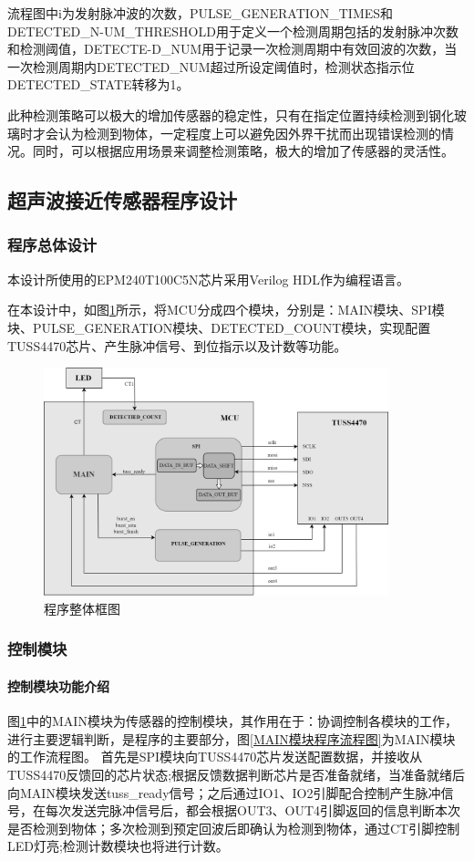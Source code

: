 \newpage
流程图中i为发射脉冲波的次数，PULSE\_GENERATION\_TIMES和DETECTED\_N-UM\_THRESHOLD用于定义一个检测周期包括的发射脉冲次数和检测阈值，DETECTE-D\_NUM用于记录一次检测周期中有效回波的次数，当一次检测周期内DETECTED\_NUM超过所设定阈值时，检测状态指示位DETECTED\_STATE转移为1。\par
此种检测策略可以极大的增加传感器的稳定性，只有在指定位置持续检测到钢化玻璃时才会认为检测到物体，一定程度上可以避免因外界干扰而出现错误检测的情况。同时，可以根据应用场景来调整检测策略，极大的增加了传感器的灵活性。


\subsection{超声波接近传感器程序设计}
\subsubsection{程序总体设计}
本设计所使用的EPM240T100C5N芯片采用Verilog HDL作为编程语言。\par
在本设计中，如图\ref{程序整体框图}所示，将MCU分成四个模块，分别是：MAIN模块、SPI模块、PULSE\_GENERATION模块、DETECTED\_COUNT模块，实现配置TUSS4470芯片、产生脉冲信号、到位指示以及计数等功能。
\begin{figure}[!h]
	\centering
	\includegraphics[width=10cm]{figure/Overall program block diagram.png}
	\caption{程序整体框图}
	\label{程序整体框图}
\end{figure}
\newpage
\subsubsection{控制模块}

\paragraph{控制模块功能介绍}
图\ref{程序整体框图}中的MAIN模块为传感器的控制模块，其作用在于：协调控制各模块的工作，进行主要逻辑判断，是程序的主要部分，图\ref{MAIN模块程序流程图}为MAIN模块的工作流程图。
首先是SPI模块向TUSS4470芯片发送配置数据，并接收从TUSS4470反馈回的芯片状态;根据反馈数据判断芯片是否准备就绪，当准备就绪后向MAIN模块发送tuss\_ready信号；之后通过IO1、IO2引脚配合控制产生脉冲信号，在每次发送完脉冲信号后，都会根据OUT3、OUT4引脚返回的信息判断本次是否检测到物体；多次检测到预定回波后即确认为检测到物体，通过CT引脚控制LED灯亮;检测计数模块也将进行计数。

